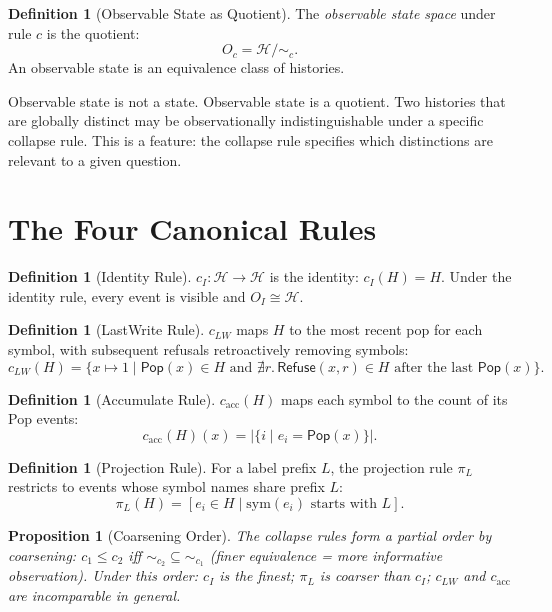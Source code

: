 \documentclass[12pt, a4paper, openany]{book}
\theoremstyle{plain}
\newtheorem{proposition}[theorem]{Proposition}
\theoremstyle{definition}
\newtheorem{definition}[theorem]{Definition}
\theoremstyle{remark}
\newcommand{\Pop}{\mathsf{Pop}}
\newcommand{\Refuse}{\mathsf{Refuse}}
\newcommand{\calH}{\mathcal{H}}
\begin{document}
\begin{definition}[Observable State as Quotient]
The \emph{observable state space} under rule $c$ is the quotient:
\[
O_c = \calH / {\sim_c}.
\]
An observable state is an equivalence class of histories.
\end{definition}

Observable state is not a state. Observable state is a quotient. Two histories
that are globally distinct may be observationally indistinguishable under a
specific collapse rule. This is a feature: the collapse rule specifies which
distinctions are relevant to a given question.

\section{The Four Canonical Rules}

\begin{definition}[Identity Rule]
$c_I : \calH \to \calH$ is the identity: $c_I(H) = H$. Under the identity rule,
every event is visible and $O_I \cong \calH$.
\end{definition}

\begin{definition}[LastWrite Rule]
$c_{LW}$ maps $H$ to the most recent pop for each symbol, with subsequent refusals
retroactively removing symbols:
\[
c_{LW}(H) = \{x \mapsto 1 \mid \Pop(x) \in H \text{ and } \nexists r.\, \Refuse(x,r) \in H \text{ after the last } \Pop(x)\}.
\]
\end{definition}

\begin{definition}[Accumulate Rule]
$c_{\mathrm{acc}}(H)$ maps each symbol to the count of its Pop events:
\[
c_{\mathrm{acc}}(H)(x) = |\{i \mid e_i = \Pop(x)\}|.
\]
\end{definition}

\begin{definition}[Projection Rule]
For a label prefix $L$, the projection rule $\pi_L$ restricts to events whose
symbol names share prefix $L$:
\[
\pi_L(H) = [e_i \in H \mid \mathrm{sym}(e_i) \text{ starts with } L].
\]
\end{definition}

\begin{proposition}[Coarsening Order]
The collapse rules form a partial order by coarsening: $c_1 \leq c_2$ iff
${\sim_{c_2}} \subseteq {\sim_{c_1}}$ (finer equivalence = more informative
observation). Under this order: $c_I$ is the finest; $\pi_L$ is coarser than
$c_I$; $c_{LW}$ and $c_{\mathrm{acc}}$ are incomparable in general.
\end{proposition}
\end{document}
